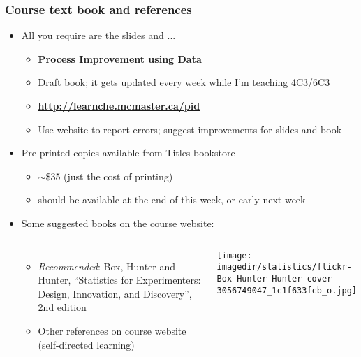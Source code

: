 \begin{frame}\frametitle{Course text book and references}
	\begin{itemize}
		\item	All you require are the slides and ... 
		\begin{itemize}
			\item	\textbf{Process Improvement using Data} 
			\item	Draft book; it gets updated every week while I'm teaching 4C3/6C3
			\item	\textbf{\href{http://learnche.mcmaster.ca/pid?source=4C3-admin-notes}{http://learnche.mcmaster.ca/pid}} 
			\item	Use website to report errors; suggest improvements for slides and book 
		\end{itemize}
	\end{itemize}
	\begin{itemize}
		\item	Pre-printed copies available from Titles bookstore 
		\begin{itemize}
			\item	$\sim$\$35 (just the cost of printing) 
			\item	should be available at the end of this week, or early next week
		\end{itemize}
	\end{itemize}
	\begin{itemize}
		\item	Some suggested books on the course website: 
		\begin{columns}[t]
				\begin{itemize}
					\item	\emph{Recommended}: Box, Hunter and Hunter, ``Statistics for Experimenters: Design, Innovation, and Discovery'', 2nd edition
					\item	Other references on course website (self-directed learning)
				\end{itemize}
				\vspace{-1cm}
				\begin{center}
					\texttt{[image: \\imagedir/statistics/flickr-Box-Hunter-Hunter-cover-3056749047\_1c1f633fcb\_o.jpg]}
				\end{center}
		\end{columns}
	\end{itemize}
\end{frame}

